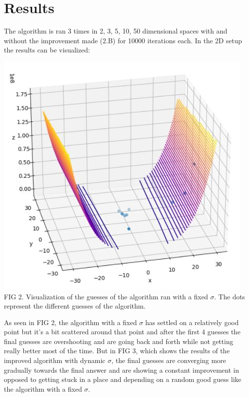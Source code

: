 \documentclass[letterpaper, 12 pt, conference]{ieeeconf}  %
\begin{document}
\section{Results}
The algorithm is ran 3 times in 2, 3, 5, 10, 50 dimensional spaces with and without the improvement made (2.B) for 10000 iterations each. In the 2D setup the results can be visualized:\\
\begin{center}
    \includegraphics[scale=0.5]{2.JPG}
    \\
    FIG 2. Visualization of the guesses of the algorithm ran with a fixed $\sigma$. The dots represent the different guesses of the algorithm.
\end{center}
As seen in FIG 2, the algorithm with a fixed $\sigma$ has settled on a relatively good point but it's a bit scattered around that point and after the first 4 guesses the final guesses are overshooting and are going back and forth while not getting really better most of the time. But in FIG 3, which shows the results of the improved algorithm with dynamic $\sigma$, the final guesses are converging more gradually towards the final answer and are showing a constant improvement in opposed to getting stuck in a place and depending on a random good guess like the algorithm with a fixed $\sigma$.
\end{document}
